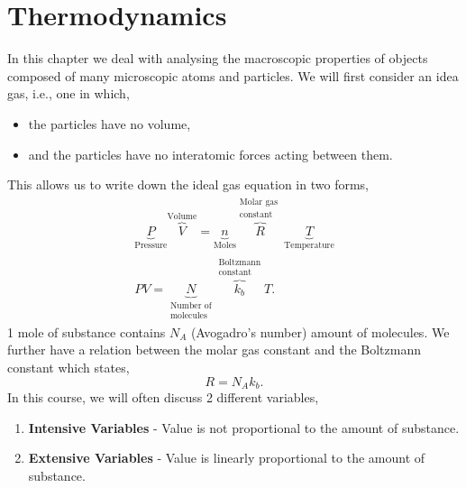 \documentclass{book}
\begin{document}
\chapter{Thermodynamics}
In this chapter we deal with analysing the macroscopic properties of objects composed of many microscopic atoms and particles. We will first consider an idea gas, i.e., one in which,
\begin{itemize}
	\item the particles have no volume,
	\item and the particles have no interatomic forces acting between them.
\end{itemize}
This allows us to write down the ideal gas equation in two forms,
\begin{align}
	\boxed{\underbrace{P}_{\text{Pressure}}\overbrace{V}^{\text{Volume}} = \underbrace{n}_{\text{Moles}}\overbrace{R}^{\substack{\text{Molar gas }\\{\text{constant}}}}\underbrace{T}_{\text{Temperature}}} \\
	\boxed{PV = \underbrace{N}_{\substack{\text{Number of}\\\text{molecules}}} \overbrace{k_b}^{\substack{\text{Boltzmann}\\\text{constant}} } T}.
\end{align}
1 mole of substance contains $N_A$ (Avogadro's number) amount of molecules. We further have a relation between the molar gas constant and the Boltzmann constant which states,
\begin{equation}
	R = N_Ak_b.
\end{equation}
In this course, we will often discuss 2 different variables,
\begin{enumerate}
	\item \textbf{Intensive Variables} - Value is not proportional to the amount of substance.
	\item \textbf{Extensive Variables} - Value is linearly proportional to the amount of substance. 
\end{enumerate}
\end{document}
